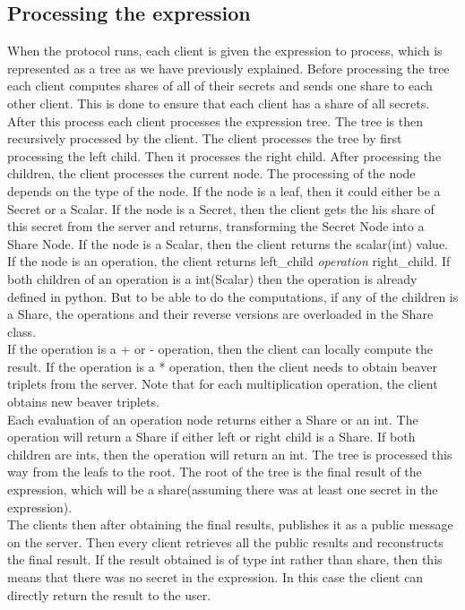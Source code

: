 \documentclass[10pt,conference,compsocconf]{IEEEtran}
\begin{document}
\subsection{Processing the expression}
\label{processing}
When the protocol runs, each client is given the expression to process, which is represented as a tree as we have previously explained. Before processing the tree
each client computes shares of all of their secrets and sends one share to each other client. This is done to ensure that each client has a share of all secrets.
After this process each client processes the expression tree. The tree is then recursively processed by the client.
The client processes the tree by first processing the left child. Then it processes the right child. After processing the children, 
the client processes the current node. The processing of the node depends on the type of the node. If the node is a leaf, then it could either be 
a Secret or a Scalar. If the node is a Secret, then the client gets the his share of this secret from the server and returns, transforming the Secret Node into a Share Node.
If the node is a Scalar, then the client returns the scalar(int) value. If the node is an operation, the client returns left\_child \textit{operation} right\_child.
If both children of an operation is a int(Scalar) then the operation is already defined in python. But to be able to do the computations, 
if any of the children is a Share, the operations and their reverse versions are overloaded in the Share class.
\\ 
If the operation is a + or - operation, then the client can locally compute the result. If the operation is a * operation, then the client needs to obtain beaver triplets from the server. 
Note that for each multiplication operation, the client obtains new beaver triplets. 
\\ 
Each evaluation of an operation node returns either a Share or an int. The operation will return a Share if either left or right child is a Share. If both children are ints, then the operation will return an int.
The tree is processed this way from the leafs to the root. The root of the tree is the final result of the expression, which will be a share(assuming there was at least one secret in the expression).
\\
The clients then after obtaining the final results, publishes it as a public message on the server. Then every client retrieves all the public results and reconstructs the final result.
If the result obtained is of type int rather than share, then this means that there was no secret in the expression. In this case the client can directly return the result to the user.
\end{document}
